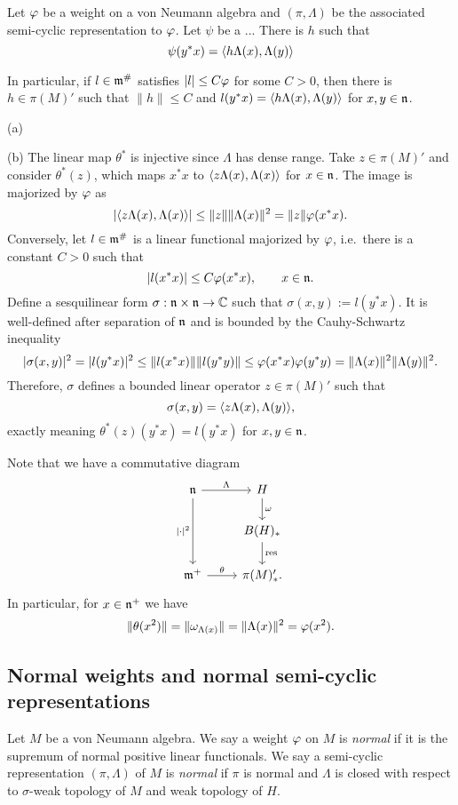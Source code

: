 \documentclass{../../small}
\begin{document}
\begin{prop}
Let $\varphi$ be a weight on a von Neumann algebra and $(\pi,\Lambda)$ be the associated semi-cyclic representation to $\varphi$.
Let $\psi$ be a ...
There is $h$ such that
\[\psi(y^*x)=\langle h\Lambda(x),\Lambda(y)\rangle\]


In particular, if $l\in\mathfrak{m}^\#$ satisfies $|l|\le C\varphi$ for some $C>0$, then there is $h\in\pi(M)'$ such that $\|h\|\le C$ and $l(y^*x)=\langle h\Lambda(x),\Lambda(y)\rangle$ for $x,y\in\mathfrak{n}$.
\end{prop}
\begin{pf}
(a)

(b)
The linear map $\theta^*$ is injective since $\Lambda$ has dense range.
Take $z\in\pi(M)'$ and consider $\theta^*(z)$, which maps $x^*x$ to $\langle z\Lambda(x),\Lambda(x)\rangle$ for $x\in\mathfrak{n}$.
The image is majorized by $\varphi$ as
\[|\langle z\Lambda(x),\Lambda(x)\rangle|\le\|z\|\|\Lambda(x)\|^2=\|z\|\varphi(x^*x).\]
Conversely, let $l\in\mathfrak{m}^\#$ is a linear functional majorized by $\varphi$, i.e.~there is a constant $C>0$ such that
\[|l(x^*x)|\le C\varphi(x^*x),\qquad x\in\mathfrak{n}.\]
Define a sesquilinear form $\sigma:\mathfrak{n}\times\mathfrak{n}\to\mathbb{C}$ such that $\sigma(x,y):=l(y^*x)$.
It is well-defined after separation of $\mathfrak{n}$ and is bounded by the Cauhy-Schwartz inequality
\[|\sigma(x,y)|^2=|l(y^*x)|^2\le\|l(x^*x)\|\|l(y^*y)\|\le\varphi(x^*x)\varphi(y^*y)=\|\Lambda(x)\|^2\|\Lambda(y)\|^2.\]
Therefore, $\sigma$ defines a bounded linear operator $z\in\pi(M)'$ such that
\[\sigma(x,y)=\langle z\Lambda(x),\Lambda(y)\rangle,\]
exactly meaning $\theta^*(z)(y^*x)=l(y^*x)$ for $x,y\in\mathfrak{n}$.
\end{pf}

Note that we have a commutative diagram
\[\begin{tikzcd}
\fn \ar{r}{\Lambda}\ar[swap]{dd}{|\cdot|^2} & H \ar{d}{\omega} \\
& B(H)_* \ar{d}{\mathrm{res}}\\
\fm^+ \ar{r}{\theta} & \pi(M)'_*.
\end{tikzcd}\]
In particular, for $x\in\mathfrak{n}^+$ we have
\[\|\theta(x^2)\|=\|\omega_{\Lambda(x)}\|=\|\Lambda(x)\|^2=\varphi(x^2).\]





\subsection{Normal weights and normal semi-cyclic representations}




\begin{defn}
Let $M$ be a von Neumann algebra.
We say a weight $\varphi$ on $M$ is \emph{normal} if it is the supremum of normal positive linear functionals.
We say a semi-cyclic representation $(\pi,\Lambda)$ of $M$ is \emph{normal} if $\pi$ is normal and $\Lambda$ is closed with respect to $\sigma$-weak topology of $M$ and weak topology of $H$.
\end{defn}
\end{document}

